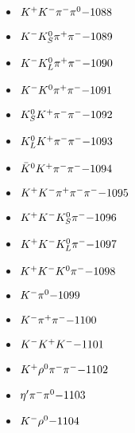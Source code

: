 \begin{multicols}{3}
\begin{itemize}
 \item $ K^{+} K^{-} \pi^{-} \pi^{0} \hfill{-1088}$
 \item $ K^{-} K_{S}^{0} \pi^{+} \pi^{-} \hfill{-1089}$
 \item $ K^{-} K_{L}^{0} \pi^{+} \pi^{-} \hfill{-1090}$
 \item $ K^{-} K^{0} \pi^{+} \pi^{-} \hfill{-1091}$
 \item $ K_{S}^{0} K^{+} \pi^{-} \pi^{-} \hfill{-1092}$
 \item $ K_{L}^{0} K^{+} \pi^{-} \pi^{-} \hfill{-1093}$
 \item $ \bar{K}^{0} K^{+} \pi^{-} \pi^{-} \hfill{-1094}$
 \item $ K^{+} K^{-} \pi^{+} \pi^{-} \pi^{-} \hfill{-1095}$
 \item $ K^{+} K^{-} K_{S}^{0} \pi^{-} \hfill{-1096}$
 \item $ K^{+} K^{-} K_{L}^{0} \pi^{-} \hfill{-1097}$
 \item $ K^{+} K^{-} K^{0} \pi^{-} \hfill{-1098}$
 \item $ K^{-} \pi^{0} \hfill{-1099}$
 \item $ K^{-} \pi^{+} \pi^{-} \hfill{-1100}$
 \item $ K^{-} K^{+} K^{-} \hfill{-1101}$
 \item $ K^{+} \rho^{0} \pi^{-} \pi^{-} \hfill{-1102}$
 \item $ {\eta^{\prime}} \pi^{-} \pi^{0} \hfill{-1103}$
 \item $ K^{-} \rho^{0} \hfill{-1104}$
 \end{itemize} 
 \end{multicols} 
